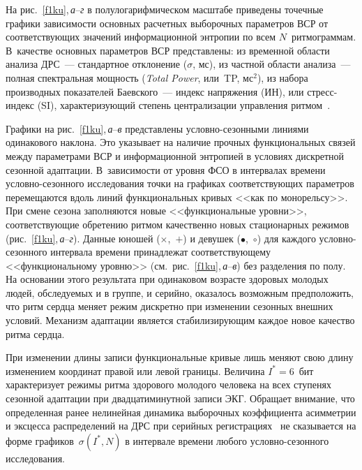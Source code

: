   \begin{multicols}{2}
  
  На рис.~\ref{f1ku},\,\textit{а}--\textit{г} в полулогарифмическом 
масштабе приведены точечные графики зависимости основных расчетных 
выборочных параметров ВСР от соответствующих значений информационной 
энтропии по всем $N$~ритмограммам. В~качестве основных параметров ВСР 
представлены: из временной области анализа ДРС~--- стандартное отклонение 
($\sigma$, мс), из частной области анализа~--- полная спектральная мощность 
(\textit{Total Power}, или~TP, мс$^2$), из набора производных показателей 
  Баевского~--- индекс напряжения (ИН), или стресс-ин\-декс (SI), 
характеризующий степень централизации управления ритмом~\cite{20ku}. 
  
  Графики на рис.~\ref{f1ku},\,\textit{а}--\textit{в} представлены 
услов\-но-се\-зон\-ны\-ми линиями одинакового наклона. Это указывает на 
наличие прочных функциональных связей между параметрами ВСР и 
информационной энтропией в условиях дискретной сезонной адаптации. 
В~зависимости от уровня ФСО в интервалах времени услов\-но-се\-зон\-но\-го 
исследования точки на графиках соответствующих параметров перемещаются 
вдоль линий функциональных кривых <<как по монорельсу>>. При смене 
сезона заполняются новые <<функциональные уровни>>, соответствующие 
обретению ритмом качественно новых стационарных режимов 
(рис.~\ref{f1ku},\,\textit{а}--\textit{г}). Данные юношей ($\times$,~$+$) и 
девушек ($\bullet$,~$\circ$) для каждого услов\-но-се\-зон\-но\-го интервала времени 
принадлежат соответствующему <<функциональному уровню>> 
(см.\ рис.~\ref{f1ku},\,\textit{а}--\textit{в}) без разделения по полу. На 
основании этого результата при одинаковом возрасте здоровых молодых 
людей, обследуемых и в группе, и серийно, оказалось возможным 
предположить, что ритм сердца меняет режим дискретно при изменении 
сезонных внешних условий. Механизм адаптации является стабилизирующим 
каждое новое качество ритма сердца.

  
  При изменении длины записи функциональные кривые лишь меняют свою 
длину изменением координат правой или левой границы. Величина $I^* = 
6$~бит характеризует режимы ритма здорового молодого человека на всех 
ступенях сезонной адаптации при двадцатиминутной записи ЭКГ. Обращает 
внимание, что определенная ранее нелинейная динамика выборочных 
коэффициента асимметрии и эксцесса распределений на ДРС при серийных 
регистрациях~\cite{6ku} не сказывается на форме графиков~$\sigma (I^*, N)$ в 
интервале времени любого услов\-но-се\-зон\-но\-го исследования.
  

\end{multicols}
